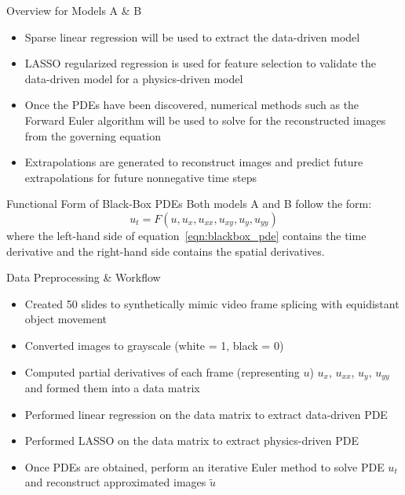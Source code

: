 \documentclass[aspectratio=169,xcolor=dvipsnames]{beamer}
\begin{document}
\begin{frame}{Overview for Models A \& B}
\begin{itemize}
    \item Sparse linear regression will be used to extract the data-driven model
    \item LASSO regularized regression is used for feature selection to validate the data-driven model for a physics-driven model
    \item Once the PDEs have been discovered, numerical methods such as the Forward Euler algorithm will be used to solve for the reconstructed images from the governing equation
    \item Extrapolations are generated to reconstruct images and predict future extrapolations for future nonnegative time steps
\end{itemize}
\begin{block}{Functional Form of Black-Box PDEs}
Both models A and B follow the form:
\begin{equation}
    u_{t} = F(u, u_{x}, u_{xx}, u_{xy}, u_{y}, u_{yy})
    \label{eqn:blackbox_pde}
\end{equation}
where the left-hand side of equation~\ref{eqn:blackbox_pde} contains the time derivative and the right-hand side contains the spatial derivatives.
\end{block}
\end{frame}

\begin{frame}{Data Preprocessing \& Workflow}
    \begin{itemize}
        \item Created 50 slides to synthetically mimic video frame splicing with equidistant object movement
        \item Converted images to grayscale (white = 1, black = 0)
        \item Computed partial derivatives of each frame (representing $u$) $u_{x}$, $u_{xx}$, $u_{y}$, $u_{yy}$ and formed them into a data matrix
        \item Performed linear regression on the data matrix to extract data-driven PDE
        \item Performed LASSO on the data matrix to extract physics-driven PDE
        \item Once PDEs are obtained, perform an iterative Euler method to solve PDE $u_{t}$ and reconstruct approximated images $\tilde{u}$
    \end{itemize}
\end{frame}
\end{document}
